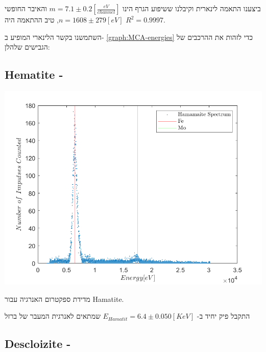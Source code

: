 \documentclass{article}
\begin{document}
ביצענו התאמה לינארית וקיבלנו ששיפוע הגרף הינו 
$m = 7.1 \pm 0.2 [\frac{eV}{channel}]$
והאיבר החופשי 
$n = 1608 \pm 279 [eV]$,
טיב ההתאמה היה 
$R^2 = 0.9997$.

השתמשנו בקשר הלינארי המופיע ב-
\ref{graph:MCA-energies}
כדי לזהות את ההרכבים של הגבישים שלהלן:


\begin{english}
\subsection{Hematite - }
\end{english}

\begin{graph}[ht]
\centering
\includegraphics[width=\textwidth]{Hamamit.png}
\caption{
מדידת ספקטרום האנרגיה עבור 
\textenglish{Hamatite}.
}
\label{graph:Hamatit-spec}
\end{graph}

התקבל פיק יחיד ב-
$E_{Hamatit} = 6.4 \pm 0.050 [KeV]$
שמתאים לאנרגית המעבר של ברזל

\begin{english}
\subsection{Descloizite - }
\end{english}
\end{document}
